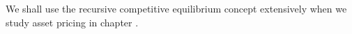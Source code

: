 

We shall use the recursive competitive equilibrium concept
extensively when  we study  asset pricing in chapter .







